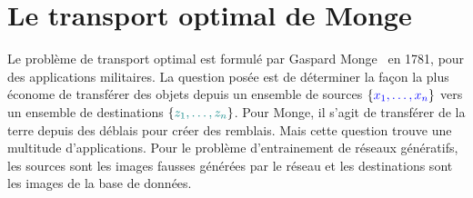 \section{Le transport optimal de Monge}
\label{sec-ot}

Le problème de transport optimal est formulé par Gaspard Monge~\cite{Monge1781} en 1781, pour des applications militaires. 
%
La question posée est de déterminer la façon la plus économe de transférer des objets  depuis un ensemble de sources  $\{\myblue{x_1,\ldots,x_n}\}$ vers un ensemble de destinations $\{\mylblue{z_1,\ldots,z_n}\}$. Pour Monge, il s'agit de transférer de la terre depuis des déblais pour créer des remblais. Mais cette question trouve une multitude d'applications. 
%
Pour le problème d'entrainement de réseaux génératifs, les sources sont les images fausses générées par le réseau et les destinations sont les images de la base de données.

\newcommand{\perm}[1]{s_{#1}}



